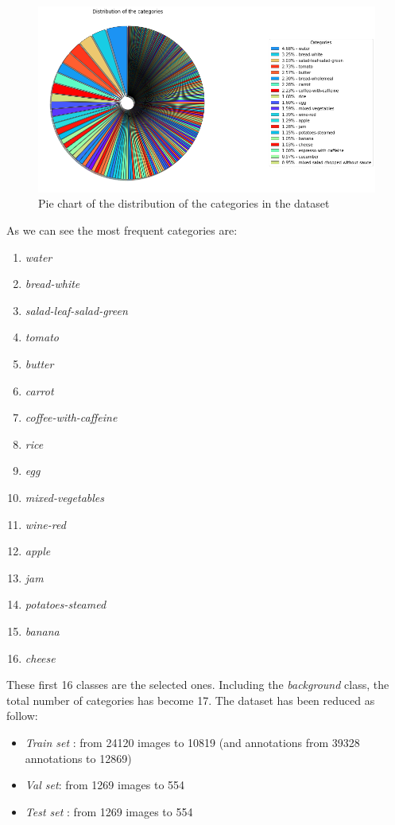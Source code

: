 \documentclass[a4paper,10pt]{report}
\begin{document}
\begin{figure}[h]
  \center
  \includegraphics[width=0.9\linewidth]{assets/img/dataset_distr.png}
  \caption{Pie chart of the distribution of the categories in the dataset}
  \label{fig:{dataset_dist}}
\end{figure}


As we can see the most frequent categories are:
\begin{enumerate}
    \item \emph{water}
    \item \emph{bread-white}
    \item \emph{salad-leaf-salad-green}
    \item \emph{tomato}
    \item \emph{butter}
    \item \emph{carrot}
    \item \emph{coffee-with-caffeine}
    \item \emph{rice}
    \item \emph{egg}
    \item \emph{mixed-vegetables}
    \item \emph{wine-red}
    \item \emph{apple}
    \item \emph{jam}
    \item \emph{potatoes-steamed}
    \item \emph{banana}
    \item \emph{cheese}
\end{enumerate}

These first 16 classes are the selected ones. Including the \emph{background} class, the total number of categories has become 17.
The dataset has been reduced as follow:
\begin{itemize}
    \item \emph{Train set} : from 24120 images to 10819 (and annotations from 39328 annotations to 12869)
    \item \emph{Val set}: from 1269 images to 554
    \item \emph{Test set} : from 1269 images to 554
\end{itemize}
\end{document}
